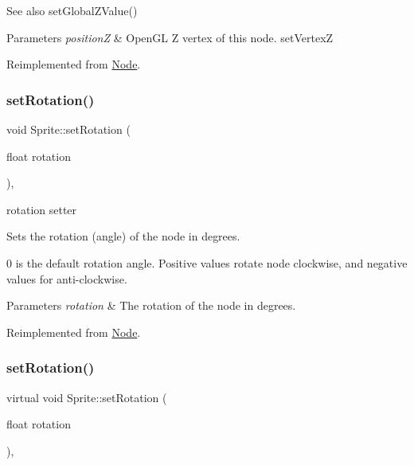 \begin{DoxySeeAlso}{See also}
{\ttfamily set\+Global\+Z\+Value()}
\end{DoxySeeAlso}

\begin{DoxyParams}{Parameters}
{\em positionZ} & Open\+GL Z vertex of this node.  set\+VertexZ \\
\hline
\end{DoxyParams}


Reimplemented from \hyperlink{classNode_aaea9bcbb6e5972122c590b930b5a90b9}{Node}.

\mbox{\label{classSprite_a943f5aa94fccc46930b978d291ff0cfe}} 
\subsubsection{\texorpdfstring{set\+Rotation()}{setRotation()}\hspace{0.1cm}{\footnotesize\ttfamily [1/2]}}
{\footnotesize\ttfamily void Sprite\+::set\+Rotation (\begin{DoxyParamCaption}\item[{float}]{rotation }\end{DoxyParamCaption})\hspace{0.3cm}{\ttfamily [override]}, {\ttfamily [virtual]}}



rotation setter 

Sets the rotation (angle) of the node in degrees.

0 is the default rotation angle. Positive values rotate node clockwise, and negative values for anti-\/clockwise.


\begin{DoxyParams}{Parameters}
{\em rotation} & The rotation of the node in degrees. \\
\hline
\end{DoxyParams}


Reimplemented from \hyperlink{classNode_a62dda439f77712f0d9b405ce887df676}{Node}.

\mbox{\label{classSprite_a456ab327b49e657c504cb41ce3f0bd77}} 
\subsubsection{\texorpdfstring{set\+Rotation()}{setRotation()}\hspace{0.1cm}{\footnotesize\ttfamily [2/2]}}
{\footnotesize\ttfamily virtual void Sprite\+::set\+Rotation (\begin{DoxyParamCaption}\item[{float}]{rotation }\end{DoxyParamCaption})\hspace{0.3cm}{\ttfamily [override]}, {\ttfamily [virtual]}}



